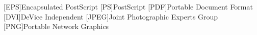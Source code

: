 [EPS]{Encapsulated PostScript}
[PS]{PostScript}
[PDF]{Portable Document Format}
[DVI]{DeVice Independent}
[JPEG]{Joint Photographic Experts Group}
[PNG]{Portable Network Graphics}
